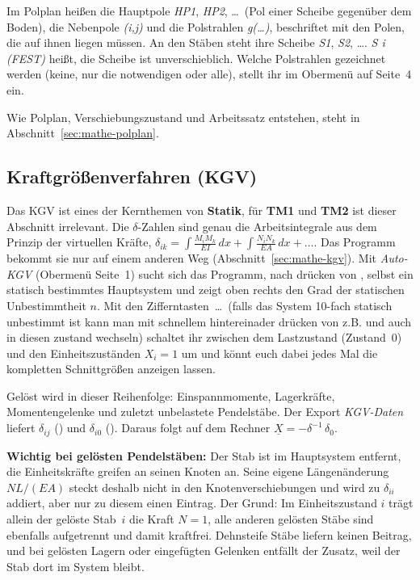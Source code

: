 Im Polplan heißen die Hauptpole \emph{HP1}, \emph{HP2}, \dots\ (Pol einer Scheibe gegenüber dem
Boden), die Nebenpole \emph{(i,j)} und die Polstrahlen \emph{g(\dots)}, beschriftet mit den Polen,
die auf ihnen liegen müssen. An den Stäben steht ihre Scheibe \emph{S1}, \emph{S2}, \dots.
\emph{S i (FEST)} heißt, die Scheibe ist unverschieblich. Welche Polstrahlen gezeichnet werden
(keine, nur die notwendigen oder alle), stellt ihr im Obermenü auf Seite~4 ein.

Wie Polplan, Verschiebungszustand und Arbeitssatz entstehen, steht in
Abschnitt~\ref{sec:mathe-polplan}.

\subsection{Kraftgrößenverfahren (KGV)}\label{sec:kgv}

Das KGV ist eines der Kernthemen von \textbf{Statik}, für \textbf{TM1} und \textbf{TM2} ist dieser
Abschnitt irrelevant. Die $\delta$-Zahlen sind genau die Arbeitsintegrale aus dem Prinzip der
virtuellen Kräfte, $\delta_{ik} = \int \frac{M_i M_k}{EI}\,dx + \int \frac{N_i N_k}{EA}\,dx +
\dots$. Das Programm bekommt sie nur auf einem anderen Weg (Abschnitt~\ref{sec:mathe-kgv}). Mit \emph{Auto-KGV} (Obermenü Seite~1) sucht sich das Programm,
nach drücken von , selbst ein statisch bestimmtes Hauptsystem und zeigt oben rechts den Grad der statischen Unbestimmtheit $n$. Mit den
Zifferntasten \,\dots\, (falls das System 10-fach statisch unbestimmt ist
kann man mit schnellem hintereinader drücken von z.B.  und  auch in diesen zustand wechseln) schaltet ihr zwischen dem Lastzustand (Zustand~0) und
den Einheitszuständen $X_i = 1$ um und könnt euch dabei jedes Mal die kompletten Schnittgrößen anzeigen lassen.

Gelöst wird in dieser Reihenfolge: Einspannmomente, Lagerkräfte, Momentengelenke und zuletzt
unbelastete Pendelstäbe. Der Export \emph{KGV-Daten} liefert $\delta_{ij}$ () und
$\delta_{i0}$ (). Daraus folgt auf dem Rechner
$\underline{X} = -\delta^{-1}\,\delta_0$.

\textbf{Wichtig bei gelösten Pendelstäben:} Der Stab ist im Hauptsystem entfernt, die
Einheitskräfte greifen an seinen Knoten an. Seine eigene Längenänderung $NL/(EA)$ steckt deshalb
nicht in den Knotenverschiebungen und wird zu $\delta_{ii}$ addiert, aber nur zu diesem einen
Eintrag. Der Grund: Im Einheitszustand $i$ trägt allein der gelöste Stab~$i$ die Kraft $N = 1$,
alle anderen gelösten Stäbe sind ebenfalls aufgetrennt und damit kraftfrei. Dehnsteife Stäbe
liefern keinen Beitrag, und bei gelösten Lagern oder eingefügten Gelenken entfällt der Zusatz,
weil der Stab dort im System bleibt.

